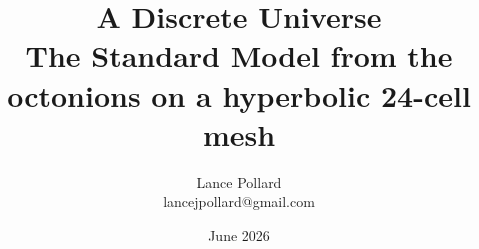 \renewcommand{\thepart}{\arabic{part}}
\titleformat{\part}[hang]{\Large\bfseries}{\thepart.}{0.5em}{}
\titlespacing*{\part}{0pt}{1.2em}{0.8em}
\titleformat{\section}{\Large\bfseries}{}{0pt}{}

\onehalfspacing

\theoremheaderfont{\bfseries}
\theorembodyfont{\normalfont}
\newtheorem{axiom}{Axiom}
\newtheorem{definition}{Definition}
\newtheorem{theorem}{Theorem}
\newtheorem{principle}{Principle}
\newtheorem{result}{Result}
\newtheorem{finding}{Finding}

\makeatletter
\def\@begintheorem#1#2#3{%
  \par\addvspace{0.5em}%
  \noindent\textbf{#1 #2.}
  \ifx\@empty#3\relax
    \quad
  \else
    \ \textbf{#3:}
  \fi
  \hspace{0.5em}
}
\def\@endtheorem{\par}
\makeatother

\title{
  {\huge \textbf{A Discrete Universe}} \\[3mm]
  \large The Standard Model from the octonions on a hyperbolic 24-cell mesh
}
\author{Lance Pollard \\ \small lancejpollard@gmail.com}
\date{June 2026}
